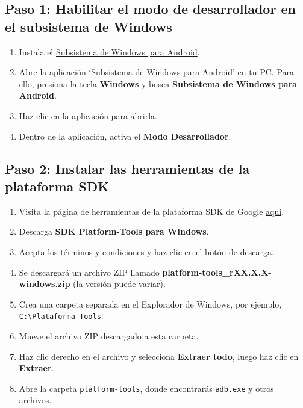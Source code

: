 \documentclass[
  doc,
  floatsintext,
  longtable,
  a4paper,
  nolmodern,
  notxfonts,
  notimes,
  12pt,
  colorlinks=true,linkcolor=blue,citecolor=blue,urlcolor=blue]{apa7}
\providecommand{\tightlist}{%
  \setlength{\itemsep}{0pt}\setlength{\parskip}{0pt}}
\begin{document}
\subsection{Paso 1: Habilitar el modo de desarrollador en el subsistema
de
Windows}\label{paso-1-habilitar-el-modo-de-desarrollador-en-el-subsistema-de-windows}

\begin{enumerate}
\def\labelenumi{\arabic{enumi}.}
\tightlist
\item
  Instala el
  \href{https://nerdschalk.com/android-apps-on-windows-11-dev-channel-how-to-install-windows-subsystem-for-android-manually-with-msixbundle/}{Subsistema
  de Windows para Android}.
\item
  Abre la aplicación `Subsistema de Windows para Android' en tu PC. Para
  ello, presiona la tecla \textbf{Windows} y busca \textbf{Subsistema de
  Windows para Android}.
\item
  Haz clic en la aplicación para abrirla.
\item
  Dentro de la aplicación, activa el \textbf{Modo Desarrollador}.
\end{enumerate}

\subsection{Paso 2: Instalar las herramientas de la plataforma
SDK}\label{paso-2-instalar-las-herramientas-de-la-plataforma-sdk}

\begin{enumerate}
\def\labelenumi{\arabic{enumi}.}
\tightlist
\item
  Visita la página de herramientas de la plataforma SDK de Google
  \href{https://developer.android.com/studio/releases/platform-tools.html}{aquí}.
\item
  Descarga \textbf{SDK Platform-Tools para Windows}.
\item
  Acepta los términos y condiciones y haz clic en el botón de descarga.
\item
  Se descargará un archivo ZIP llamado
  \textbf{platform-tools\_rXX.X.X-windows.zip} (la versión puede
  variar).
\item
  Crea una carpeta separada en el Explorador de Windows, por ejemplo,
  \texttt{C:\textbackslash{}Plataforma-Tools}.
\item
  Mueve el archivo ZIP descargado a esta carpeta.
\item
  Haz clic derecho en el archivo y selecciona \textbf{Extraer todo},
  luego haz clic en \textbf{Extraer}.
\item
  Abre la carpeta \texttt{platform-tools}, donde encontrarás
  \texttt{adb.exe} y otros archivos.
\end{enumerate}
\end{document}
